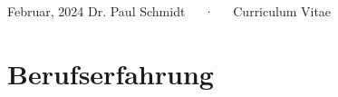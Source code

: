 \documentclass[11pt,a4paper,]{awesome-cv}
\begin{document}
\makecvheader

\makecvfooter
  {Februar, 2024}
    {Dr. Paul Schmidt~~~·~~~Curriculum Vitae}
  {\thepage}






\hypertarget{berufserfahrung}{%
\section{Berufserfahrung}\label{berufserfahrung}}
\end{document}
